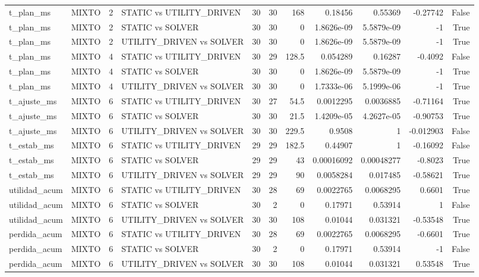 \begin{tabular}{llrlrrrrrrr}
t_plan_ms & MIXTO & 2 & STATIC vs UTILITY_DRIVEN & 30 & 30 & 168 & 0.18456 & 0.55369 & -0.27742 & False \\
t_plan_ms & MIXTO & 2 & STATIC vs SOLVER & 30 & 30 & 0 & 1.8626e-09 & 5.5879e-09 & -1 & True \\
t_plan_ms & MIXTO & 2 & UTILITY_DRIVEN vs SOLVER & 30 & 30 & 0 & 1.8626e-09 & 5.5879e-09 & -1 & True \\
t_plan_ms & MIXTO & 4 & STATIC vs UTILITY_DRIVEN & 30 & 29 & 128.5 & 0.054289 & 0.16287 & -0.4092 & False \\
t_plan_ms & MIXTO & 4 & STATIC vs SOLVER & 30 & 30 & 0 & 1.8626e-09 & 5.5879e-09 & -1 & True \\
t_plan_ms & MIXTO & 4 & UTILITY_DRIVEN vs SOLVER & 30 & 30 & 0 & 1.7333e-06 & 5.1999e-06 & -1 & True \\
t_ajuste_ms & MIXTO & 6 & STATIC vs UTILITY_DRIVEN & 30 & 27 & 54.5 & 0.0012295 & 0.0036885 & -0.71164 & True \\
t_ajuste_ms & MIXTO & 6 & STATIC vs SOLVER & 30 & 30 & 21.5 & 1.4209e-05 & 4.2627e-05 & -0.90753 & True \\
t_ajuste_ms & MIXTO & 6 & UTILITY_DRIVEN vs SOLVER & 30 & 30 & 229.5 & 0.9508 & 1 & -0.012903 & False \\
t_estab_ms & MIXTO & 6 & STATIC vs UTILITY_DRIVEN & 29 & 29 & 182.5 & 0.44907 & 1 & -0.16092 & False \\
t_estab_ms & MIXTO & 6 & STATIC vs SOLVER & 29 & 29 & 43 & 0.00016092 & 0.00048277 & -0.8023 & True \\
t_estab_ms & MIXTO & 6 & UTILITY_DRIVEN vs SOLVER & 29 & 29 & 90 & 0.0058284 & 0.017485 & -0.58621 & True \\
utilidad_acum & MIXTO & 6 & STATIC vs UTILITY_DRIVEN & 30 & 28 & 69 & 0.0022765 & 0.0068295 & 0.6601 & True \\
utilidad_acum & MIXTO & 6 & STATIC vs SOLVER & 30 & 2 & 0 & 0.17971 & 0.53914 & 1 & False \\
utilidad_acum & MIXTO & 6 & UTILITY_DRIVEN vs SOLVER & 30 & 30 & 108 & 0.01044 & 0.031321 & -0.53548 & True \\
perdida_acum & MIXTO & 6 & STATIC vs UTILITY_DRIVEN & 30 & 28 & 69 & 0.0022765 & 0.0068295 & -0.6601 & True \\
perdida_acum & MIXTO & 6 & STATIC vs SOLVER & 30 & 2 & 0 & 0.17971 & 0.53914 & -1 & False \\
perdida_acum & MIXTO & 6 & UTILITY_DRIVEN vs SOLVER & 30 & 30 & 108 & 0.01044 & 0.031321 & 0.53548 & True \\

\end{tabular}

